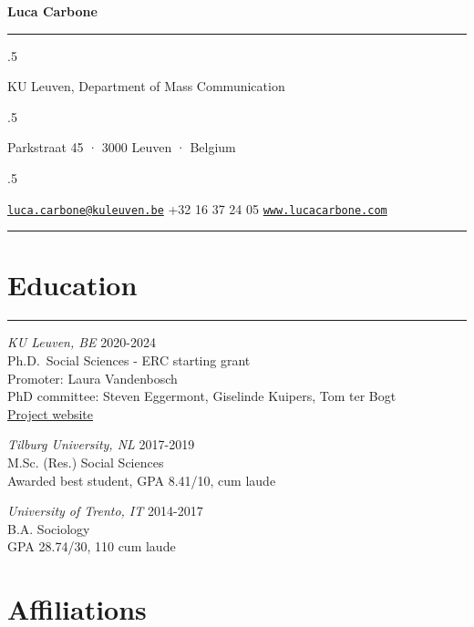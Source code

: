 \documentclass[12pt,]{article}
\begin{document}
\centerline{\huge \bf Luca Carbone}

\vspace{2 mm}

\hrule

\vspace{2 mm}

\moveleft.5\hoffset\centerline{KU Leuven, Department of Mass
Communication}
\moveleft.5\hoffset\centerline{Parkstraat 45 · 3000 Leuven · Belgium}
\moveleft.5\hoffset\centerline{ \faEnvelopeO \hspace{1 mm} \href{mailto:}{\tt \href{mailto:luca.carbone@kuleuven.be}{\nolinkurl{luca.carbone@kuleuven.be}}} \hspace{1 mm}  \faPhone \hspace{1 mm}  +32
16 37 24
05  \hspace{1 mm}      \faGlobe \hspace{1 mm} \href{http://www.lucacarbone.com}{\tt www.lucacarbone.com}   } 

\vspace{2 mm}

\hrule


\hypertarget{education}{%
\section{Education}\label{education}}

\vspace{-10pt}
\rule{1\linewidth}{\linethickness}

\emph{KU Leuven, BE} \hfill \begingroup\small 2020-2024\endgroup\\
Ph.D.~Social Sciences - ERC starting grant\\
Promoter: Laura Vandenbosch\\
PhD committee: Steven Eggermont, Giselinde Kuipers, Tom ter Bogt\\
\href{http://www.projectmimic.eu}{Project website}

\emph{Tilburg University, NL}
\hfill \begingroup\small 2017-2019\endgroup\\
M.Sc. (Res.) Social Sciences\\
Awarded best student, GPA 8.41/10, cum laude

\emph{University of Trento, IT}
\hfill \begingroup\small 2014-2017\endgroup\\
B.A. Sociology\\
GPA 28.74/30, 110 cum laude

\hypertarget{affiliations}{%
\section{Affiliations}\label{affiliations}}
\end{document}
